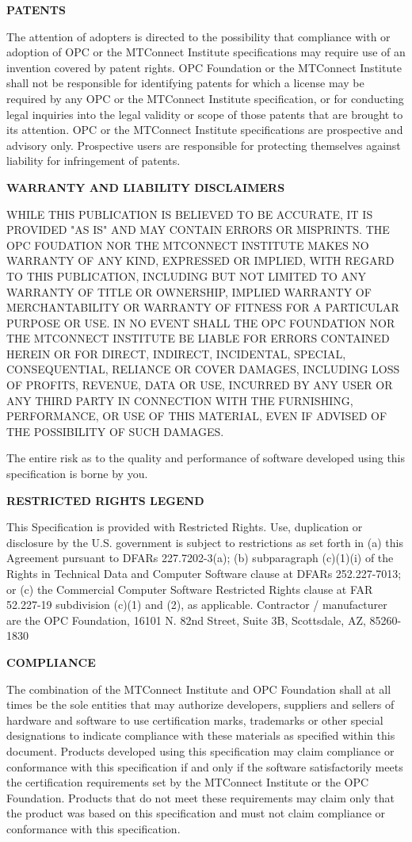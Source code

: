 \textbf{PATENTS} 

The attention of adopters is directed to the possibility that compliance with or adoption of OPC or the MTConnect Institute specifications may require use of an invention covered by patent rights. OPC Foundation or the MTConnect Institute shall not be responsible for identifying patents for which a license may be required by any OPC or the MTConnect Institute specification, or for conducting legal inquiries into the legal validity or scope of those patents that are brought to its attention. OPC or the MTConnect Institute specifications are prospective and advisory only. Prospective users are responsible for protecting themselves against liability for infringement of patents.

\textbf{WARRANTY AND LIABILITY DISCLAIMERS}

WHILE THIS PUBLICATION IS BELIEVED TO BE ACCURATE, IT IS PROVIDED "AS IS" AND MAY CONTAIN ERRORS OR MISPRINTS. THE OPC FOUDATION NOR THE MTCONNECT INSTITUTE MAKES NO WARRANTY OF ANY KIND, EXPRESSED OR IMPLIED, WITH REGARD TO THIS PUBLICATION, INCLUDING BUT NOT LIMITED TO ANY WARRANTY OF TITLE OR OWNERSHIP, IMPLIED WARRANTY OF MERCHANTABILITY OR WARRANTY OF FITNESS FOR A PARTICULAR PURPOSE OR USE. IN NO EVENT SHALL THE OPC FOUNDATION NOR THE MTCONNECT INSTITUTE BE LIABLE FOR ERRORS CONTAINED HEREIN OR FOR DIRECT, INDIRECT, INCIDENTAL, SPECIAL, CONSEQUENTIAL, RELIANCE OR COVER DAMAGES, INCLUDING LOSS OF PROFITS, REVENUE, DATA OR USE, INCURRED BY ANY USER OR ANY THIRD PARTY IN CONNECTION WITH THE FURNISHING, PERFORMANCE, OR USE OF THIS MATERIAL, EVEN IF ADVISED OF THE POSSIBILITY OF SUCH DAMAGES.

The entire risk as to the quality and performance of software developed using this specification is borne by you. 

\textbf{RESTRICTED RIGHTS LEGEND}

This Specification is provided with Restricted Rights. Use, duplication or disclosure by the U.S. government is subject to restrictions as set forth in (a) this Agreement pursuant to DFARs 227.7202-3(a); (b) subparagraph (c)(1)(i) of the Rights in Technical Data and Computer Software clause at DFARs 252.227-7013; or (c) the Commercial Computer Software Restricted Rights clause at FAR 52.227-19 subdivision (c)(1) and (2), as applicable. Contractor / manufacturer are the OPC Foundation, 16101 N. 82nd Street, Suite 3B, Scottsdale, AZ, 85260-1830

\textbf{COMPLIANCE}

The combination of the MTConnect Institute and OPC Foundation shall at all times be the sole entities that may authorize developers, suppliers and sellers of hardware and software to use certification marks, trademarks or other special designations to indicate compliance with these materials as specified within this document. Products developed using this specification may claim compliance or conformance with this specification if and only if the software satisfactorily meets the certification requirements set by the MTConnect Institute or the OPC Foundation. Products that do not meet these requirements may claim only that the product was based on this specification and must not claim compliance or conformance with this specification. 

